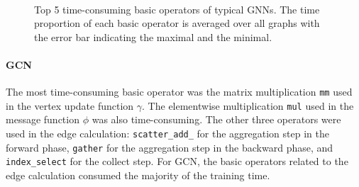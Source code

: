 \begin{figure}
    \centering
    \\
    \caption{Top 5 time-consuming basic operators of typical GNNs. The time proportion of each basic operator is averaged over all graphs with the error bar indicating the maximal and the minimal.}
    \label{fig:exp_top_basic_ops}
\end{figure}

\paragraph{GCN}
The most time-consuming basic operator was the matrix multiplication \texttt{mm} used in the vertex update function $\gamma$.
The elementwise multiplication \texttt{mul} used in the message function $\phi$ was also time-consuming.
The other three operators were used in the edge calculation: \texttt{scatter\_add\_} for the aggregation step in the forward phase, \texttt{gather} for the aggregation step in the backward phase, and \texttt{index\_select} for the collect step.
For GCN, the basic operators related to the edge calculation consumed the majority of the training time.

